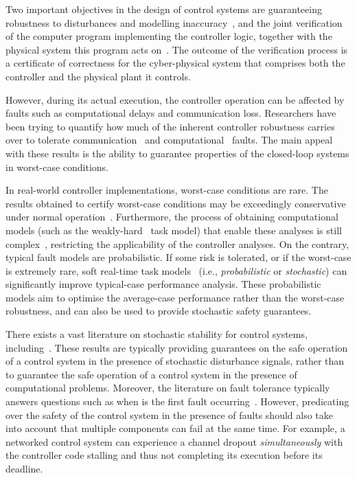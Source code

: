 Two important objectives in the design of control systems are guaranteeing robustness to disturbances and modelling inaccuracy~\cite{Astrom:1997}, and the joint verification of the computer program implementing the controller logic, together with the physical system this program acts on~\cite{Bohrer:2018}.
The outcome of the verification process is a certificate of correctness for the cyber-physical system that comprises both the controller and the physical plant it controls.

However, during its actual execution, the controller operation can be affected by faults such as computational delays and communication loss.
Researchers have been trying to quantify how much of the inherent controller robustness carries over to tolerate communication~\cite{Ahrendts:2018, Linsenmayer:2017} and computational~\cite{Pazzaglia:2018, Maggio:2020, Hobbs:2022} faults.
The main appeal with these results is the ability to guarantee properties of the closed-loop systems in worst-case conditions.

In real-world controller implementations, worst-case conditions are rare.
The results obtained to certify worst-case conditions may be exceedingly conservative under normal operation~\cite{Vreman:2021}.
Furthermore, the process of obtaining computational models (such as the weakly-hard~\cite{Bernat:2001} task model) that enable these analyses is still complex~\cite{Sun:2017}, restricting the applicability of the controller analyses.
On the contrary, typical fault models are probabilistic.
If some risk is tolerated, or if the worst-case is extremely rare, soft real-time task models~\cite{Buttazzo:2005} (i.e., \emph{probabilistic} or \emph{stochastic}) can significantly improve typical-case performance analysis.
These probabilistic models aim to optimise the average-case performance rather than the worst-case robustness, and can also be used to provide stochastic safety guarantees.

There exists a vast literature on stochastic stability for control systems, including~\cite{Fang:2002, Liberzon:2014, Blair:1975, Lincoln:2002, Bolzern:2010, Astrom:1970}.
These results are typically providing guarantees on the safe operation of a control system in the presence of stochastic disturbance signals, rather than to guarantee the safe operation of a control system in the presence of computational problems.
Moreover, the literature on fault tolerance typically answers questions such as when is the first fault occurring~\cite{Safari:2022}.
However, predicating over the safety of the control system in the presence of faults should also take into account that multiple components can fail at the same time.
For example, a networked control system can experience a channel dropout \emph{simultaneously} with the controller code stalling and thus not completing its execution before its deadline.

